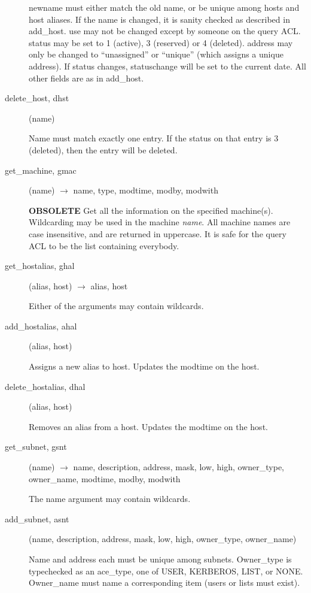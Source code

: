 \begin{description}
newname must either match the old name, or be unique among hosts and
host aliases.  If the name is changed, it is sanity checked as
described in add\_host.  use may not be changed except by someone on
the query ACL.  status may be set to 1 (active), 3 (reserved) or 4
(deleted).  address may only be changed to ``unassigned'' or ``unique''
(which assigns a unique address).  If status changes, statuschange
will be set to the current date.  All other fields are as in add\_host.

\item[delete\_host, dhst](name)

Name must match exactly one entry.  If the status on that entry is 3
(deleted), then the entry will be deleted.

\item[get\_machine, gmac](name) $\rightarrow$ name, type, modtime, modby, modwith

{\bf OBSOLETE} Get all the information on the specified machine(s).
Wildcarding may be used in the machine {\em name}.  All machine names
are case insensitive, and are returned in uppercase.  It is safe for
the query ACL to be the list containing everybody.

\item[get\_hostalias, ghal](alias, host) $\rightarrow$ alias, host

Either of the arguments may contain wildcards.

\item[add\_hostalias, ahal](alias, host)

Assigns a new alias to host.  Updates the modtime on the host.

\item[delete\_hostalias, dhal](alias, host)

Removes an alias from a host.  Updates the modtime on the
host.

\item[get\_subnet, gsnt](name) $\rightarrow$ name, description, address,
mask, low, high, owner\_type, owner\_name, modtime, modby, modwith

The name argument may contain wildcards.

\item[add\_subnet, asnt](name, description, address, mask, low, high, owner\_type,
owner\_name)

Name and address each must be unique among subnets.  Owner\_type
is typechecked as an ace\_type, one of USER, KERBEROS, LIST, or NONE.
Owner\_name must name a corresponding item (users or lists must exist).


\end{description}
